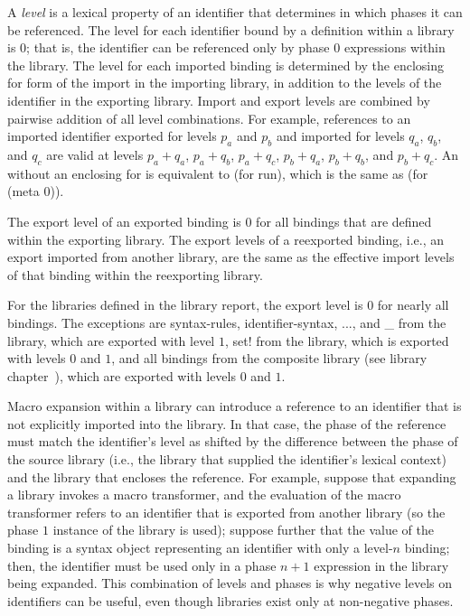 %
A \emph{level} is a lexical property of an identifier that determines
in which phases it can be referenced. The level for each identifier
bound by a definition within a library is $0$; that is, the identifier
can be referenced only by phase $0$ expressions within the library.
The level for each imported binding is determined by the enclosing {\cf
  for} form of the {\cf import} in the importing library, in
addition to the levels of the identifier in the exporting
library. Import and export levels are combined by pairwise addition of
all level combinations.  For example, references to an imported
identifier exported for levels $p_a$ and $p_b$ and imported for levels
$q_a$, $q_b$, and $q_c$ are valid at levels $p_a+q_a$, $p_a+q_b$,
$p_a+q_c$, $p_b+q_a$, $p_b+q_b$, and $p_b+q_c$. An 
without an enclosing {\cf for} is equivalent to {\cf (for
   run)}, which is the same as {\cf (for
   (meta 0))}.

The export level of an exported binding is $0$ for all bindings
that are defined within the exporting library. The export levels of a
reexported binding, i.e., an export imported from another library, are the
same as the effective import levels of that binding within the reexporting
library.

For the libraries defined in the library report, the export level is
$0$ for nearly all bindings. The exceptions are {\cf syntax-rules},
{\cf identifier-syntax}, {\cf ...}, and {\cf \_} from the
 library, which are exported with level $1$, {\cf
  set!} from the  library, which is exported with
levels $0$ and $1$, and all bindings from the composite
\thersixlibrary{} library (see library
chapter~), which are
exported with levels $0$ and $1$.

Macro expansion within a library can introduce a reference to an
identifier that is not explicitly imported into the library. In that
case, the phase of the reference must match the identifier's level as
shifted by the difference between the phase of the source library
(i.e., the library that supplied the identifier's lexical context) and
the library that encloses the reference. For example, suppose that
expanding a library invokes a macro transformer, and the evaluation of
the macro transformer refers to an identifier that is exported from
another library (so the phase $1$ instance of the library is used);
suppose further that the value of the binding is a syntax object
representing an identifier with only a level-$n$ binding; then, the
identifier must be used only in a phase $n+1$ expression in the
library being expanded. This combination of levels and phases is why
negative levels on identifiers can be useful, even though libraries
exist only at non-negative phases.

